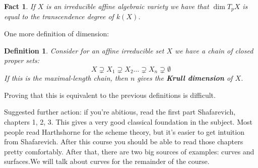 \documentclass[12pt]{article}
\newtheorem{fact}{Fact}[section]
\newtheorem{definition}{Definition}[section]
\begin{document}
    \begin{fact}
        If $X$ is an irreducible affine algebraic variety we have that $\dim T_pX$ is equal to the transcendence degree of $k(X)$.
    \end{fact}
    One more definition of dimension:
    \begin{definition}
        Consider for an affine irreducible set $X$ we have a chain of closed proper sets:
        $$X \supsetneq X_1 \supsetneq X_2 \dots \supsetneq X_n \supsetneq \emptyset $$
        If this is the maximal-length chain, then $n$ gives the \textbf{Krull dimension} of $X$.
    \end{definition}
    Proving that this is equivalent to the previous definitions is difficult.\par
    Suggested further action: if you're abitious, read the first part Shafarevich, chapters 1, 2, 3. This gives a very good classical foundation in the subject. Most people read Harthshorne for the scheme theory, but it's easier to get intuition from Shafarevich. After this course you should be able to read those chapters pretty comfortably. After that, there are two big sources of examples: curves and surfaces.We will talk about curves for the remainder of the course.
\end{document}
